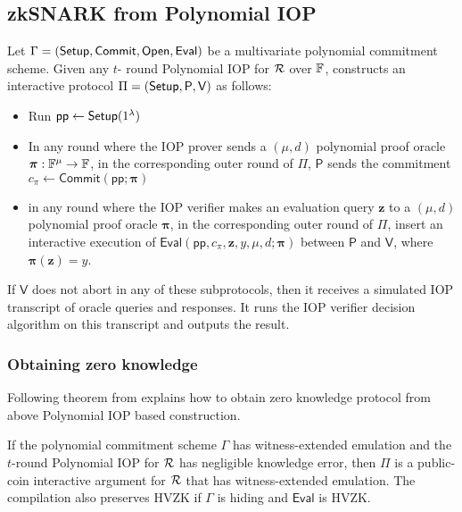 \documentclass[runningheads]{llncs}
\def\commit{\mathsf{Commit}}
\def\open{\mathsf{Open}}
\def\eval{\mathsf{Eval}}
\def\pp{\mathsf{pp}}
\def\prover{\mathsf{P}}
\def\verifier{\mathsf{V}}
\begin{document}
\subsection{zkSNARK from Polynomial IOP} 
Let $\Gamma = (\setup, \commit, \open, \eval)$ be a multivariate polynomial commitment scheme. Given any $t$- round Polynomial IOP for $\mathcal{R}$ over $\mathbb{F}$, \cite{DARK19} constructs an interactive protocol $\Pi = (\setup, \prover, \verifier)$ as follows:
\begin{itemize}
	\item Run $\pp \leftarrow \setup(\secparam)$
	
	\item In any round where the IOP prover sends a $(\mu, d)$ polynomial proof oracle $\bm{\pi} : \mathbb{F}^{\mu} \rightarrow \mathbb{F}$, in the corresponding outer round of $\Pi$, $\prover$ sends the commitment $c_{\pi} \leftarrow \commit(\pp;\bm{\pi})$
	
	\item in any round where the IOP verifier makes an evaluation query $\bm{z}$ to a $(\mu,d)$ polynomial proof oracle $\bm{\pi}$, in the corresponding outer round of $\Pi$, insert an interactive execution of $\eval(\pp, c_{\pi}, \bm{z}, y, \mu,d; \bm{\pi})$ between $\prover$ and $\verifier$, where $\bm{\pi}(\bm{z})=y$.
\end{itemize}

If $\verifier$ does not abort in any of these subprotocols, then it receives a simulated IOP transcript of oracle queries and responses. It runs the IOP verifier decision algorithm on this transcript and outputs the result.

\subsubsection{Obtaining zero knowledge} Following theorem from \cite{DARK19} explains how to obtain zero knowledge protocol from above Polynomial IOP based construction.

\begin{theorem}
	If the polynomial commitment scheme $\Gamma$ has witness-extended emulation and the $t$-round Polynomial IOP for $\mathcal{R}$ has negligible knowledge error, then $\Pi$ is a public-coin interactive argument for $\mathcal{R}$ that has witness-extended emulation. The compilation also preserves HVZK if $\Gamma$ is hiding and $\eval$ is HVZK.
\end{theorem}
\end{document}
